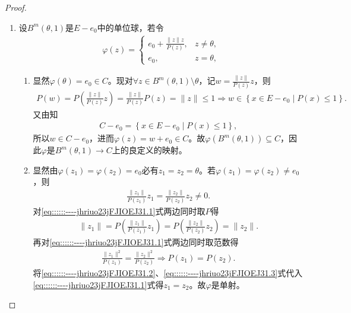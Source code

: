 \documentclass[../../main.tex]{subfiles}%
\begin{document}
\begin{proof}
\begin{enumerate}[(1)]
\item 设$B^m(\theta, 1)$是$E - e_0$中的单位球，若令
\begin{align*}
\varphi(z) = \begin{cases}
e_0 + \frac{\|z\| z}{P(z)}, & z \neq \theta, \\
e_0, & z = \theta,
\end{cases}
\end{align*}
\begin{enumerate}[(1)]
\item 显然$\varphi(\theta)=e_0\in C$。现对$\forall z\in B^m(\theta,1)\setminus\theta$，记$w=\frac{\|z\|}{P(z)}z$，则\begin{align*}
P(w)=P\left(\frac{\|z\|}{P(z)}z\right)=\frac{\|z\|}{P(z)}P(z)=\|z\|\leqslant 1\Longrightarrow w\in\left\{x\in E-e_0\mid P(x)\leqslant 1\right\}.
\end{align*}
又由知\begin{align}\label{eq::::::----jhriuo23jFJIOEJ31.0}
C-e_0=\left\{x\in E-e_0\mid P(x)\leqslant 1\right\},
\end{align}
所以$w\in C-e_0$，进而$\varphi(z)=w+e_0\in C$。故$\varphi\left(B^m(\theta,1)\right)\subseteq C$，因此$\varphi$是$B^m(\theta,1)\rightarrow C$上的良定义的映射。

\item 显然由$\varphi(z_1)=\varphi(z_2)=e_0$必有$z_1=z_2=\theta$。若$\varphi(z_1)=\varphi(z_2)\ne e_0$，则\begin{align}\label{eq::::::----jhriuo23jFJIOEJ31.1}
\frac{\|z_1\|}{P(z_1)}z_1=\frac{\|z_2\|}{P(z_2)}z_2\ne 0.
\end{align}
对\eqref{eq::::::----jhriuo23jFJIOEJ31.1}式两边同时取$P$得\begin{align}\label{eq::::::----jhriuo23jFJIOEJ31.2}
\|z_1\|=P\left(\frac{\|z_1\|}{P(z_1)}z_1\right)=P\left(\frac{\|z_2\|}{P(z_2)}z_2\right)=\|z_2\|.
\end{align}
再对\eqref{eq::::::----jhriuo23jFJIOEJ31.1}式两边同时取范数得\begin{align}\label{eq::::::----jhriuo23jFJIOEJ31.3}
\frac{\|z_1\|^2}{P(z_1)}=\frac{\|z_2\|^2}{P(z_2)}\Longrightarrow P(z_1)=P(z_2).
\end{align}
将\eqref{eq::::::----jhriuo23jFJIOEJ31.2}、\eqref{eq::::::----jhriuo23jFJIOEJ31.3}式代入\eqref{eq::::::----jhriuo23jFJIOEJ31.1}式得$z_1=z_2$。故$\varphi$是单射。


\end{enumerate}
\end{enumerate}
\end{proof}
\end{document}
